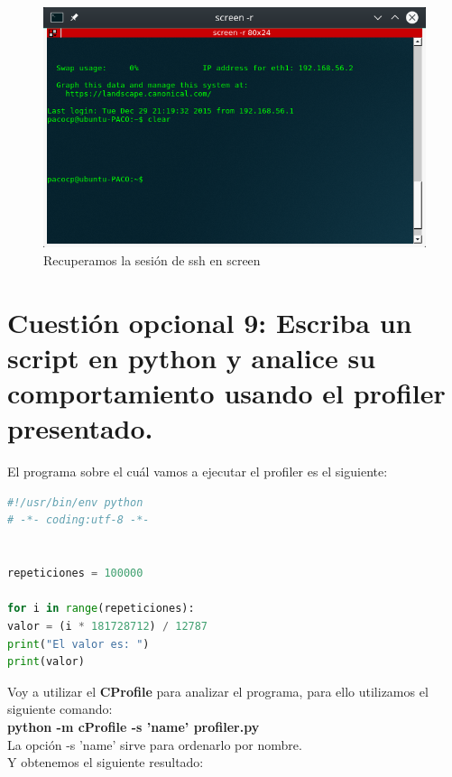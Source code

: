 \begin{figure}[H] %
	\centering
	\includegraphics[scale=0.5]{figuras/figura27.png}  %
	
	
	\caption{Recuperamos la sesión de ssh en screen}
	\label{figura27}
\end{figure}

\section{Cuestión opcional 9: Escriba un script en python y analice su comportamiento usando el profiler presentado.}
El programa sobre el cuál vamos a ejecutar el profiler es el siguiente:\\

\begin{lstlisting}[language=python]
#!/usr/bin/env python
# -*- coding:utf-8 -*-


repeticiones = 100000

for i in range(repeticiones):
valor = (i * 181728712) / 12787
print("El valor es: ")
print(valor)

\end{lstlisting}

Voy a utilizar el \textbf{CProfile} \cite{pprofiler} para analizar el programa, para ello utilizamos el siguiente comando:\\
\textbf{python -m cProfile  -s 'name'  profiler.py}\\

La opción -s 'name' sirve para ordenarlo por nombre.\\
Y obtenemos el siguiente resultado:\\

